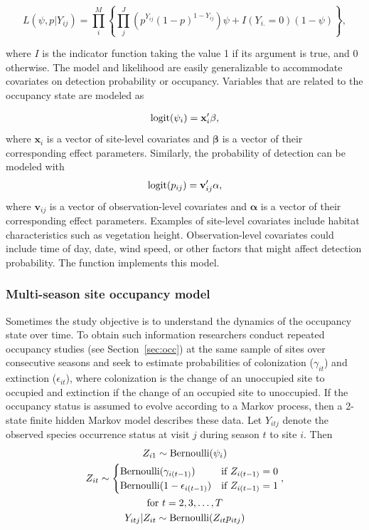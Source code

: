 \documentclass[article,shortnames]{jss}
\DeclareMathOperator{\logit}{logit}
\DeclareMathOperator{\Bern}{Bernoulli}
\begin{document}
\begin{equation}
L(\psi, p | Y_{ij}) = 
 \prod_{i}^{M} \left\{
    \prod_{j}^{J} 
      \left(p^{Y_{ij}}(1-p)^{1-Y_{ij}}\right)
          \psi + I(Y_{i.}=0)(1-\psi) \right\},  
\end{equation}

where $I$ is the indicator function taking the value 1 if its argument is 
true, and 0 otherwise. The model and likelihood are easily generalizable to 
accommodate covariates on detection probability or occupancy.
Variables that are related to the occupancy state are modeled as

\begin{gather}
  \logit(\psi_i) = \mathbf x_i' \mathbf \beta, \notag
\end{gather}
where $\mathbf x_i$ is a vector of site-level covariates and $\mathbf \beta$
is a vector of their corresponding effect parameters.  Similarly, the
probability of detection can be modeled with
\begin{gather}
  \logit(p_{ij}) = \mathbf v_{ij}' \mathbf \alpha, \notag
\end{gather}
where $\mathbf v_{ij}$ is a vector of observation-level covariates and
$\mathbf \alpha$ is a vector of their corresponding effect parameters.  
Examples of site-level covariates include habitat characteristics such as 
vegetation height. Observation-level covariates could include time of day, 
date, wind speed, or other factors that might affect detection probability. 
The function  implements this model.


\subsubsection{Multi-season site occupancy model} 

Sometimes the study objective is to understand the dynamics of the 
occupancy state over time. To obtain such information researchers conduct 
repeated occupancy studies (see Section~\ref{sec:occ}) at the same sample of 
sites over consecutive seasons \citep{MacKenzie2003} and seek to estimate
probabilities of colonization ($\gamma_{it}$) and extinction
($\epsilon_{it}$), where colonization is the change of an unoccupied
site to occupied and extinction if the change of an occupied site to
unoccupied.  If the occupancy status is assumed to evolve according to
a Markov process, then a 2-state finite hidden Markov model describes
these data.  Let $Y_{itj}$ denote the observed species occurrence
status at visit $j$ during season $t$ to site $i$.  Then
\begin{gather}
  Z_{i1} \sim \Bern(\psi_i) \notag \\
  Z_{it} \sim
  \begin{cases}
    \Bern(\gamma_{i(t-1)}) & \text{if $Z_{i(t-1)} = 0$} \notag \\
    \Bern(1-\epsilon_{i(t-1)}) & \text{if $Z_{i(t-1)} = 1$}
  \end{cases}, \\
  \text{for $t=2,3,\dots,T$} \notag \\
  Y_{itj} | Z_{it} \sim \Bern(Z_{it} p_{itj}) \notag
\end{gather}
\end{document}

